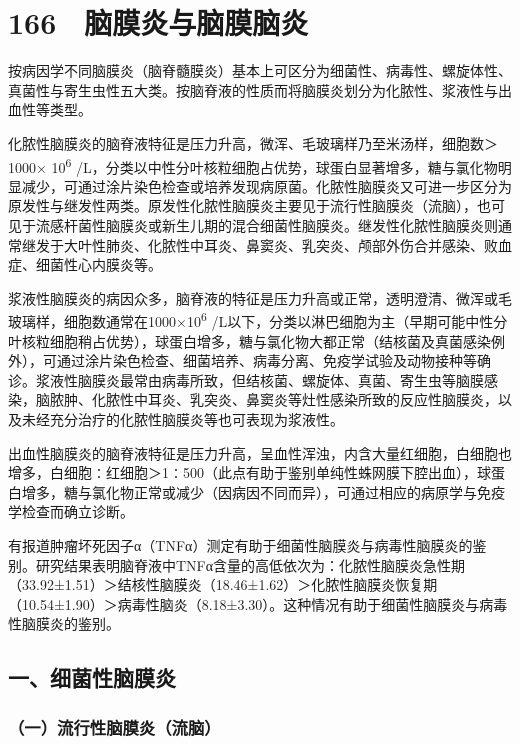 \protect\hypertarget{text00384.html}{}{}

\section{166　脑膜炎与脑膜脑炎}

按病因学不同脑膜炎（脑脊髓膜炎）基本上可区分为细菌性、病毒性、螺旋体性、真菌性与寄生虫性五大类。按脑脊液的性质而将脑膜炎划分为化脓性、浆液性与出血性等类型。

化脓性脑膜炎的脑脊液特征是压力升高，微浑、毛玻璃样乃至米汤样，细胞数＞1000×
10\textsuperscript{6}
/L，分类以中性分叶核粒细胞占优势，球蛋白显著增多，糖与氯化物明显减少，可通过涂片染色检查或培养发现病原菌。化脓性脑膜炎又可进一步区分为原发性与继发性两类。原发性化脓性脑膜炎主要见于流行性脑膜炎（流脑），也可见于流感杆菌性脑膜炎或新生儿期的混合细菌性脑膜炎。继发性化脓性脑膜炎则通常继发于大叶性肺炎、化脓性中耳炎、鼻窦炎、乳突炎、颅部外伤合并感染、败血症、细菌性心内膜炎等。

浆液性脑膜炎的病因众多，脑脊液的特征是压力升高或正常，透明澄清、微浑或毛玻璃样，细胞数通常在1000×10\textsuperscript{6}
/L以下，分类以淋巴细胞为主（早期可能中性分叶核粒细胞稍占优势），球蛋白增多，糖与氯化物大都正常（结核菌及真菌感染例外），可通过涂片染色检查、细菌培养、病毒分离、免疫学试验及动物接种等确诊。浆液性脑膜炎最常由病毒所致，但结核菌、螺旋体、真菌、寄生虫等脑膜感染，脑脓肿、化脓性中耳炎、乳突炎、鼻窦炎等灶性感染所致的反应性脑膜炎，以及未经充分治疗的化脓性脑膜炎等也可表现为浆液性。

出血性脑膜炎的脑脊液特征是压力升高，呈血性浑浊，内含大量红细胞，白细胞也增多，白细胞∶红细胞＞1∶500（此点有助于鉴别单纯性蛛网膜下腔出血），球蛋白增多，糖与氯化物正常或减少（因病因不同而异），可通过相应的病原学与免疫学检查而确立诊断。

有报道肿瘤坏死因子α（TNFα）测定有助于细菌性脑膜炎与病毒性脑膜炎的鉴别。研究结果表明脑脊液中TNFα含量的高低依次为：化脓性脑膜炎急性期（33.92±1.51）＞结核性脑膜炎（18.46±1.62）＞化脓性脑膜炎恢复期（10.54±1.90）＞病毒性脑炎（8.18±3.30）。这种情况有助于细菌性脑膜炎与病毒性脑膜炎的鉴别。

\subsection{一、细菌性脑膜炎}

\subsubsection{（一）流行性脑膜炎（流脑）}

